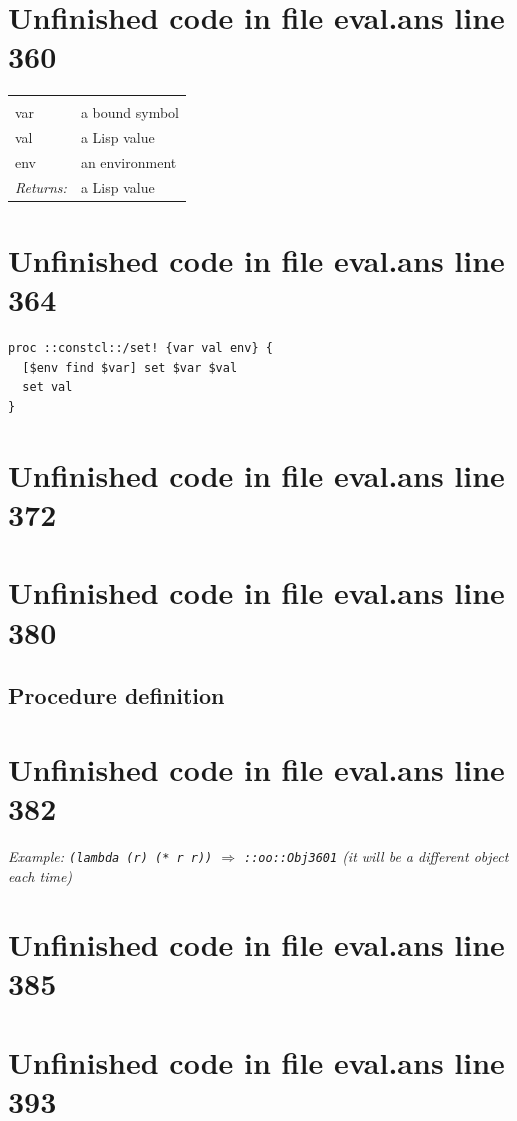\documentclass[twoside,9pt]{report}
\begin{document}
\section{Unfinished code in file eval.ans line 360}
\noindent\begin{tabular}{ |p{1.9cm} p{8cm}| }
\hline
\rowcolor[HTML]{CCCCCC} \multicolumn{2}{|l|}{\bf /set! (internal)} \\
var & a bound symbol \\
val & a Lisp value \\
env & an environment \\
\textit{Returns:} & a Lisp value \\
\hline
\end{tabular}
\section{Unfinished code in file eval.ans line 364}
\begin{lstlisting}
proc ::constcl::/set! {var val env} {
  [$env find $var] set $var $val
  set val
}
\end{lstlisting}
\section{Unfinished code in file eval.ans line 372}
\section{Unfinished code in file eval.ans line 380}
\subsection{Procedure definition}
\label{procedure-definition}
\section{Unfinished code in file eval.ans line 382}


\emph{Example: \texttt{(lambda (r) (* r r))} $\Rightarrow$ \texttt{::oo::Obj3601} (it will be a different object each time)}

\section{Unfinished code in file eval.ans line 385}
\section{Unfinished code in file eval.ans line 393}
\end{document}
